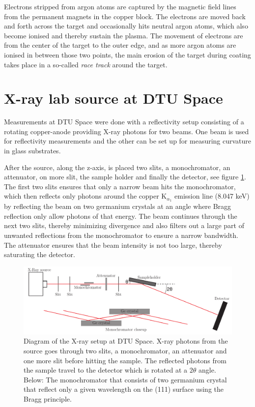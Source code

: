 Electrons stripped from argon atoms are captured by the magnetic field lines from the permanent magnets in the copper block. The electrons are moved back and forth across the target and occasionally hits neutral argon atoms, which also become ionised and thereby sustain the plasma. The movement of electrons are from the center of the target to the outer edge, and as more argon atoms are ionised in between those two points, the main erosion of the target during coating takes place in a so-called \emph{race track} around the target.
%
%

\section{X-ray lab source at DTU Space}
Measurements at DTU Space were done with a reflectivity setup consisting of a rotating copper-anode providing X-ray photons for two beams. One beam is used for reflectivity measurements and the other can be set up for measuring curvature in glass substrates.

After the source, along the z-axis, is placed two slits, a monochromator, an attenuator, on more slit, the sample holder and finally the detector, see figure \ref{fig:xraysetup}. The first two slits ensures that only a narrow beam hits the monochromator, which then reflects only photons around the copper K$_{\alpha_1}$ emission line (8.047 keV) by reflecting the beam on two germanium crystals at an angle where Bragg reflection only allow photons of that energy. The beam continues through the next two slits, thereby minimizing divergence and also filters out a large part of unwanted reflections from the monochromator to ensure a narrow bandwidth. The attenuator ensures that the beam intensity is not too large, thereby saturating the detector.

\begin{figure}[!h]
  \center
  \includegraphics[width=0.8\linewidth]{figures/chamber/xraysetup.pdf}
\caption{\footnotesize Diagram of the X-ray setup at DTU Space. X-ray photons from the source goes through two slits, a monochromator, an attenuator and one more slit before hitting the sample. The reflected photons from the sample travel to the detector which is rotated at a $2\theta$ angle. Below: The monochromator that consists of two germanium crystal that reflect only a given wavelength on the (111) surface using the Bragg principle.}\label{fig:xraysetup}
\end{figure}

